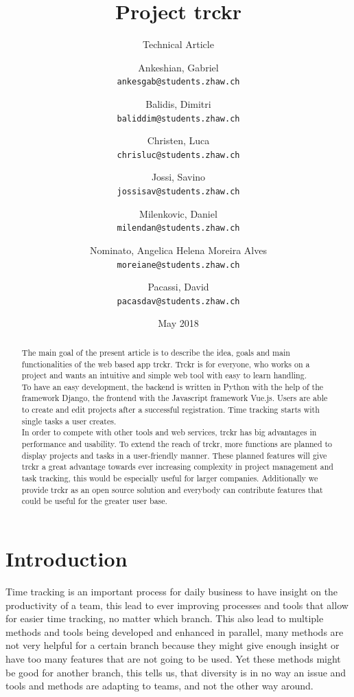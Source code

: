 \documentclass[a4paper, 12pt, headsepline]{scrartcl}
\title{Project trckr}
\subtitle{Technical Article}
\date{May 2018}
\author{
Ankeshian, Gabriel\\
\texttt{ankesgab@students.zhaw.ch}
\and
Balidis, Dimitri\\
\texttt{baliddim@students.zhaw.ch}
\and
Christen, Luca\\
\texttt{chrisluc@students.zhaw.ch}
\and
Jossi, Savino\\
\texttt{jossisav@students.zhaw.ch}
\and
Milenkovic, Daniel\\
\texttt{milendan@students.zhaw.ch}
\and
Nominato, Angelica Helena Moreira Alves\\
\texttt{moreiane@students.zhaw.ch}
\and
Pacassi, David\\
\texttt{pacasdav@students.zhaw.ch}}
\begin{document}
\maketitle
\pagebreak

\begin{abstract}
The main goal of the present article is to describe the idea, goals and main functionalities of the web based app trckr. Trckr is for everyone,
who works on a project and wants an intuitive and simple web tool with easy to learn handling.\\
To have an easy development, the backend is written in Python with the help of the framework Django, the frontend with the Javascript
framework Vue.js. Users are able to create and edit projects after a successful registration. Time tracking starts with single tasks
a user creates.\\
In order to compete with other tools and web services, trckr has big advantages in performance and usability. To extend the reach of trckr, more
functions are planned to display projects and tasks in a user-friendly manner. These planned features will give trckr a great advantage towards ever
increasing complexity in project management and task tracking, this would be especially useful for larger companies. Additionally we provide trckr
as an open source solution and everybody can contribute features that could be useful for the greater user base.

\end{abstract}

\pagebreak


\tableofcontents

\pagebreak

\section{Introduction}
Time tracking is an important process for daily business to have insight on the productivity of a team, this lead to ever improving processes and tools
that allow for easier time tracking, no matter which branch. This also lead to multiple methods and tools being developed and enhanced in parallel,
many methods are not very helpful for a certain branch because they might give enough insight or have too many features that are not going to be used.
Yet these methods might be good for another branch, this tells us, that diversity is in no way an issue and tools and methods are adapting to teams,
and not the other way around.
\end{document}
